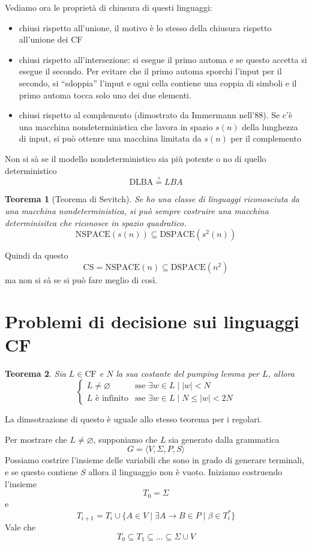 \documentclass[12pt]{report}
\newtheorem{teorema}{Teorema}
\theoremstyle{definition}
\begin{document}
Vediamo ora le proprietà di chiusura di questi linguaggi:
\begin{itemize}
	\item chiusi rispetto all'unione, il motivo è lo stesso della chiusura rispetto all'unione dei CF
	\item chiusi rispetto all'intersezione: si esegue il primo automa e se questo accetta si esegue il secondo.
		Per evitare che il primo automa sporchi l'input per il secondo, si ``sdoppia'' l'input e ogni cella contiene una coppia di simboli e il primo automa tocca solo uno dei due elementi.
	\item chiusi rispetto al complemento (dimostrato da Immermann nell'88).
		Se c'è una macchina nondeterministica che lavora in spazio $s(n)$ della lunghezza di input, si può ottenre una macchina limitata da $s(n)$ per il complemento
\end{itemize}
Non si sà se il modello nondeterministico sia più potente o no di quello deterministico
$$ \text{DLBA} \overset{?}{=} LBA $$
\begin{teorema}[Teorema di Sevitch]
	Se ho una classe di linguaggi riconosciuta da una macchina nondeterministica, si può sempre costruire una macchina determinisitca che riconosce in spazio quadratico.
	$$ \text{NSPACE}(s(n)) \subseteq \text{DSPACE}(s^2(n)) $$
\end{teorema}
Quindi da questo 
$$ \text{CS} = \text{NSPACE}(n) \subseteq \text{DSPACE}(n^2) $$
ma non si sà se si può fare meglio di così.

\section{Problemi di decisione sui linguaggi CF}\label{sec:problemi di decisione sui linguaggi CF}
\begin{teorema}
	Sia $L \in \text{CF}$ e $N$ la sua costante del pumping lemma per $L$, allora
	$$ \begin{cases}
		L \neq \varnothing & \text{sse } \exists w \in L \mid |w| < N \\
		L \text{ è infinito} & \text{sse } \exists w \in L \mid N \leq |w| < 2N
	\end{cases}
	$$
\end{teorema}
La dimsotrazione di questo è uguale allo stesso teorema per i regolari.

Per mostrare che $L \neq \varnothing$, supponiamo che $L$ sia generato dalla grammatica
$$ G = \langle V, \Sigma, P, S \rangle $$
Possiamo costrire l'insieme delle variabili che sono in grado di generare terminali, e se questo contiene $S$ allora il linguaggio non è vuoto.
Iniziamo costruendo l'insieme
$$ T_0 = \Sigma $$
e 
$$ T_{i + 1} = T_i \cup \{ A \in V \mid \exists A \rightarrow B \in P \mid \beta \in T_i^* \} $$
Vale che
$$ T_0 \subseteq T_1 \subseteq \dots \subseteq \Sigma \cup V $$
\end{document}
